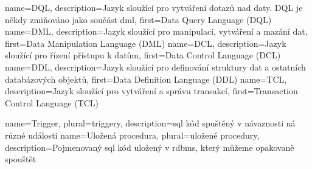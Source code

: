 
{
    name={DQL},
    description={Jazyk sloužící pro vytváření dotazů nad daty. DQL je někdy zmiňováno jako součást \gls{dml}},
    first={Data Query Language (DQL)}
}
{
    name={DML},
    description={Jazyk sloužící pro manipulaci, vytváření a mazání dat},
    first={Data Manipulation Language (DML)}
}
{
    name={DCL},
    description={Jazyk sloužící pro řízení přístupu k datům},
    first={Data Control Language (DCL)}
}
{
    name={DDL},
    description={Jazyk sloužící pro definování struktury dat a ostatních databázových objektů},
    first={Data Definition Language (DDL)}
}
{
    name={TCL},
    description={Jazyk sloužící pro vytváření a správu transakcí},
    first={Transaction Control Language (TCL)}
}


{
    name={Trigger},
    plural={triggery},
    description={\acrshort{sql} kód spuštěný v návaznosti ná různé události}
}
{
    name={Uložená procedura},
    plural={uložené procedury},
    description={Pojmenovaný \acrshort{sql} kód uložený v \acrshort{rdbms}, který můžeme opakovaně spouštět}
}